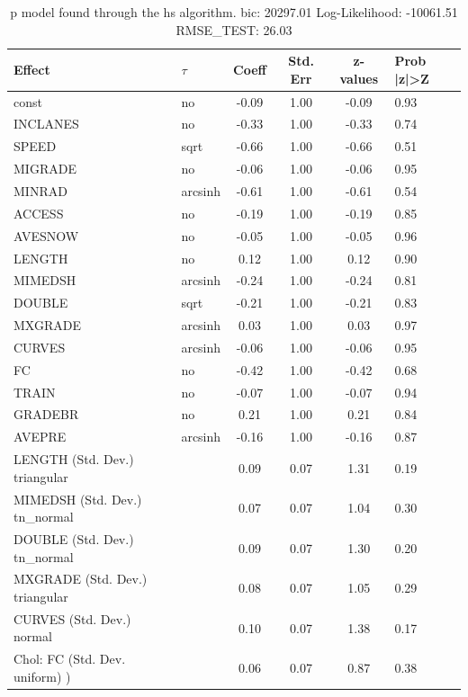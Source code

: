 \begin{table}
	\caption{p model found through the hs algorithm. bic: 20297.01 Log-Likelihood: -10061.51 RMSE_TEST: 26.03}
	\begin{center}
		\begin{tabular}{|l|l|c|c|c|l|}
			\hline
			Effect & $\tau$ & Coeff & Std. Err & z-values & Prob |z|>Z \\
			\hline
			const & no & -0.09 & 1.00 & -0.09 & 0.93 \\
			\hline
			INCLANES & no & -0.33 & 1.00 & -0.33 & 0.74 \\
			\hline
			SPEED & sqrt & -0.66 & 1.00 & -0.66 & 0.51 \\
			\hline
			MIGRADE & no & -0.06 & 1.00 & -0.06 & 0.95 \\
			\hline
			MINRAD & arcsinh & -0.61 & 1.00 & -0.61 & 0.54 \\
			\hline
			ACCESS & no & -0.19 & 1.00 & -0.19 & 0.85 \\
			\hline
			AVESNOW & no & -0.05 & 1.00 & -0.05 & 0.96 \\
			\hline
			LENGTH & no & 0.12 & 1.00 & 0.12 & 0.90 \\
			\hline
			MIMEDSH & arcsinh & -0.24 & 1.00 & -0.24 & 0.81 \\
			\hline
			DOUBLE & sqrt & -0.21 & 1.00 & -0.21 & 0.83 \\
			\hline
			MXGRADE & arcsinh & 0.03 & 1.00 & 0.03 & 0.97 \\
			\hline
			CURVES & arcsinh & -0.06 & 1.00 & -0.06 & 0.95 \\
			\hline
			FC & no & -0.42 & 1.00 & -0.42 & 0.68 \\
			\hline
			TRAIN & no & -0.07 & 1.00 & -0.07 & 0.94 \\
			\hline
			GRADEBR & no & 0.21 & 1.00 & 0.21 & 0.84 \\
			\hline
			AVEPRE & arcsinh & -0.16 & 1.00 & -0.16 & 0.87 \\
			\hline
			LENGTH (Std. Dev.) triangular &  & 0.09 & 0.07 & 1.31 & 0.19 \\
			\hline
			MIMEDSH (Std. Dev.) tn_normal &  & 0.07 & 0.07 & 1.04 & 0.30 \\
			\hline
			DOUBLE (Std. Dev.) tn_normal &  & 0.09 & 0.07 & 1.30 & 0.20 \\
			\hline
			MXGRADE (Std. Dev.) triangular &  & 0.08 & 0.07 & 1.05 & 0.29 \\
			\hline
			CURVES (Std. Dev.) normal &  & 0.10 & 0.07 & 1.38 & 0.17 \\
			\hline
			 Chol: FC (Std. Dev. uniform) ) &  & 0.06 & 0.07 & 0.87 & 0.38 \\

\end{tabular}
\end{center}
\end{table}
